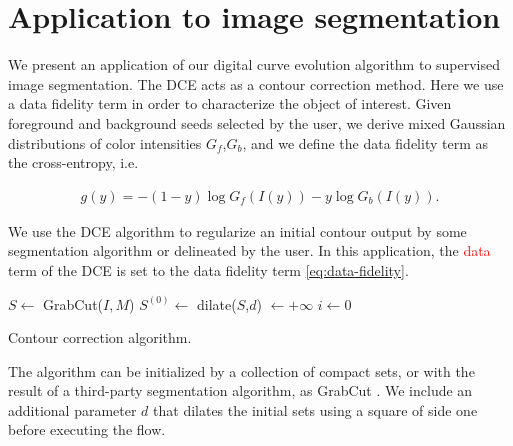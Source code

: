 \documentclass[smallextended]{svjour3}       %
\newcommand{\revision}[1]{\textcolor{red}{#1}}
\begin{document}
{{\section{Application to image segmentation}

We present an application of our digital curve evolution algorithm to supervised image segmentation. The DCE acts as a
contour correction method. Here we use a data fidelity term in order to characterize the object of
interest. Given foreground and background seeds selected by the user, we derive mixed Gaussian distributions of color
intensities $G_f$,$G_b$, and we define the data fidelity term as the cross-entropy, i.e.
	
\begin{align}
  g(y) = -(1-y)\log{G_f(I(y))} - y\log{G_b(I(y))}.
  \label{eq:data-fidelity}
\end{align}	

We use the DCE algorithm to regularize an initial contour output by some segmentation algorithm or delineated by the user. In this application, the \revision{data} term of the DCE
is set to the data fidelity term \eqref{eq:data-fidelity}.
	
\begin{algorithm}[H]
 
 \BlankLine

 $S \longleftarrow$ GrabCut($I,M$)\;
 $S^{(0)} \longleftarrow $ dilate($S$,$d$)\; 
 \Delta $\longleftarrow +\infty$\;
 $i \longleftarrow 0$\;
 \label{alg:contour-correction} 
 \caption{Contour correction algorithm.}
\end{algorithm}	

The algorithm can be initialized by a collection of compact sets, or with the result of a third-party segmentation algorithm, as GrabCut \cite{rother04grabcut}. We include an additional parameter $d$ that dilates the initial sets using a square of side one before executing the flow.
	
}}
\end{document}
